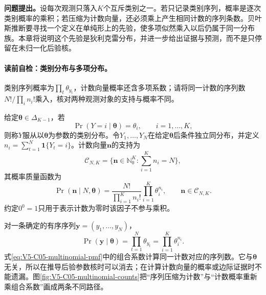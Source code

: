 
\label{struct:V5-C05-CH06}
\textbf{问题提出。}设每次观测只落入$K$个互斥类别之一。若只记录类别序列，概率是逐次类别概率的乘积；若压缩为计数向量，还必须乘上产生相同计数的序列条数。贝叶斯推断要寻找一个定义在单纯形上的先验，使多项似然乘入以后仍属于同一分布族。本章将说明这个先验是狄利克雷分布，并进一步给出证据与预测，而不是只停留在未归一化后验核。

\label{struct:V5-C05-CH07}
\paragraph{读前自检：类别分布与多项分布。}类别序列概率为$\prod_t\theta_{y_t}$，计数向量概率还含多项系数；请将同一计数的序列数$N!/\prod_i n_i!$乘入，核对两种观测对象的支持与概率不同。\par

\begin{definition}[类别分布与多项分布]\label{def:V5-C05-multinomial}
给定$\boldsymbol\theta\in\Delta_{K-1}$，若
\[
\Pr(Y=i\mid\boldsymbol\theta)=\theta_i,\qquad i=1,\ldots,K,
\]
则称$Y$服从以$\boldsymbol\theta$为参数的类别分布。令$Y_1,\ldots,Y_N$在给定$\boldsymbol\theta$后条件独立同分布，并定义$n_i=\sum_{t=1}^N\mathbf 1\{Y_t=i\}$。计数向量$\boldsymbol n$的支持为
\[
\mathcal C_{N,K}
=\{\boldsymbol n\in\mathbb N_0^K:\textstyle\sum_{i=1}^K n_i=N\},
\]
其概率质量函数为
\begin{equation}\label{eq:V5-C05-multinomial-pmf}
\Pr(\boldsymbol n\mid N,\boldsymbol\theta)
=\frac{N!}{\prod_{i=1}^K n_i!}
\prod_{i=1}^K\theta_i^{n_i},
\qquad \boldsymbol n\in\mathcal C_{N,K}.
\end{equation}
约定$0^0=1$只用于表示计数为零时该因子不参与乘积。
\end{definition}

对一条确定的有序序列$\boldsymbol y=(y_1,\ldots,y_N)$，
\begin{equation}\label{eq:V5-C05-sequence-likelihood}
\Pr(\boldsymbol y\mid\boldsymbol\theta)
=\prod_{t=1}^N\theta_{y_t}
=\prod_{i=1}^K\theta_i^{n_i}.
\end{equation}
式\eqref{eq:V5-C05-multinomial-pmf}中的组合系数计算同一计数对应的序列数。它与$\boldsymbol\theta$无关，所以在推导后验参数核时可以消去；在计算计数向量的概率或边际证据时不能遗漏。图\ref{fig:V5-C05-multinomial-counts}把“序列压缩为计数”与“计数概率重新乘组合系数”画成两条不同路径。


